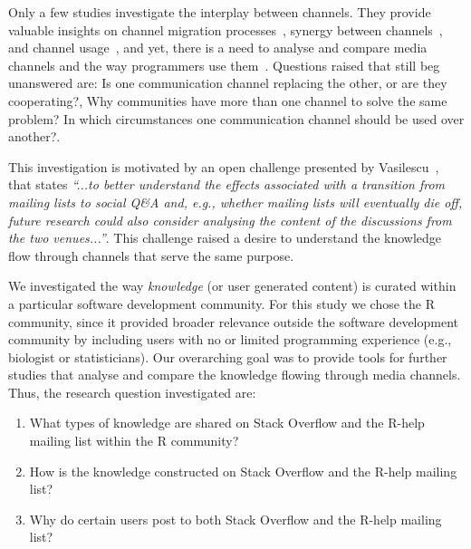 \documentclass{sig-alternate-05-2015}
\begin{document}
	Only a few studies investigate the interplay between channels.
	They provide valuable insights on channel migration processes~\cite{Vasilescu2014c}, synergy between channels~\cite{Vasilescu2013a, Bird2006, Kavaler2013}, and channel usage~\cite{Stolee2010,Storey2014}, and yet, there is a need to analyse and compare media channels and the way programmers use them~\cite{Vasilescu2014b}.
	Questions raised that still beg unanswered are: Is one communication channel replacing the other, or are they cooperating?, Why communities have more than one channel to solve the same problem? In which circumstances one communication channel should be used over another?.

This investigation is motivated by an open challenge presented by Vasilescu~\cite{Vasilescu2014b}, that states \textit{``...to better understand the effects associated with a transition from mailing lists to social Q\&A and, e.g., whether mailing lists will eventually die off, future research could also consider analysing the content of the discussions from the two venues...''}.
This challenge raised a desire to understand the knowledge flow through channels that serve the same purpose.

	We investigated the way \textit{knowledge} (or user generated content) is curated within a particular software development community.
	For this study we chose the R community, since it provided broader relevance outside the software development community by including users with no or limited programming experience (e.g., biologist or statisticians).
	Our overarching goal was to provide tools for further studies that analyse and compare the knowledge flowing through media channels.
	Thus, the research question investigated are:

	\begin{enumerate}[\bfseries RQ-1.]
		\item What types of knowledge are shared on Stack Overflow and the R-help mailing list within the R community?
		\item How is the knowledge constructed on Stack Overflow and the R-help mailing list? 
		\item Why do certain users post to both Stack Overflow and the R-help mailing list?
	\end{enumerate}
\end{document}
